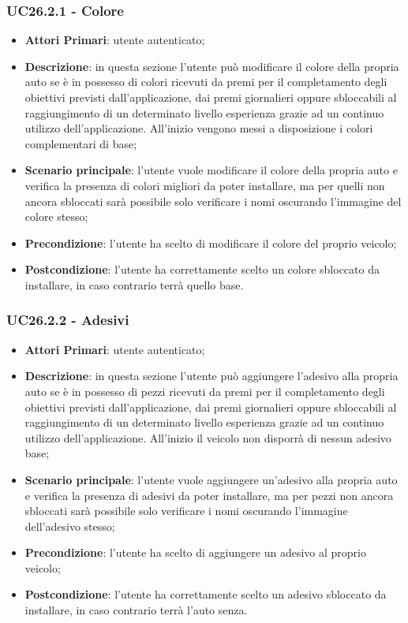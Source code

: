 \subsubsection{UC26.2.1 - Colore}
\begin{itemize}
	\item \textbf{Attori Primari}: utente autenticato;
	\item \textbf{Descrizione}: in questa sezione l'utente può modificare il colore della propria auto se è in possesso di colori ricevuti da premi per il completamento degli obiettivi previsti dall'applicazione, dai premi giornalieri oppure sbloccabili al raggiungimento di un determinato livello esperienza grazie ad un continuo utilizzo dell'applicazione.
	All'inizio vengono messi a disposizione i colori complementari di base;
	\item \textbf{Scenario principale}: l'utente vuole modificare il colore della propria auto e verifica la presenza di colori migliori da poter installare, ma per quelli non ancora sbloccati sarà possibile solo verificare i nomi oscurando l'immagine del colore stesso;
	\item \textbf{Precondizione}: l'utente ha scelto di modificare il colore del proprio veicolo; 
	\item \textbf{Postcondizione}: l'utente ha correttamente scelto un colore sbloccato da installare, in caso contrario terrà quello base.
\end{itemize}
\subsubsection{UC26.2.2 - Adesivi}
\begin{itemize}
	\item \textbf{Attori Primari}: utente autenticato;
	\item \textbf{Descrizione}: in questa sezione l'utente può aggiungere l'adesivo alla propria auto se è in possesso di pezzi ricevuti da premi per il completamento degli obiettivi previsti dall'applicazione, dai premi giornalieri oppure sbloccabili al raggiungimento di un determinato livello esperienza grazie ad un continuo utilizzo dell'applicazione.
	All'inizio il veicolo non disporrà di nessun adesivo base;
	\item \textbf{Scenario principale}: l'utente vuole aggiungere un'adesivo alla propria auto e verifica la presenza di adesivi da poter installare, ma per pezzi non ancora sbloccati sarà possibile solo verificare i nomi oscurando l'immagine dell'adesivo stesso;
	\item \textbf{Precondizione}: l'utente ha scelto di aggiungere un adesivo al proprio veicolo; 
	\item \textbf{Postcondizione}: l'utente ha correttamente scelto un adesivo sbloccato da installare, in caso contrario terrà l'auto senza.
\end{itemize}
